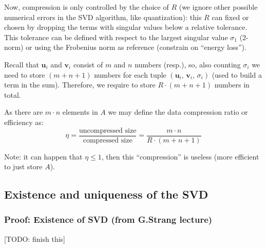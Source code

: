 \documentclass[
  12pt,
  paper=a4,
]{scrartcl} %
\begin{document}
Now, compression is only controlled by the choice of $R$ (we ignore other possible numerical errors in the SVD algorithm, like quantization): this $R$ can fixed or chosen by dropping the terms with singular values below a relative tolerance. This tolerance can be defined with respect to the largest singular value $\sigma_1$ (2-norm) or using the Frobenius norm as reference (constrain on ``energy loss'').


Recall that $\bm u_i$ and $\bm v_i$ consist of $m$ and $n$ numbers (resp.), so, also counting $\sigma_i$ we need to store $(m+n+1)$ numbers for each tuple $(\bm u_i,\,\bm v_i,\,\sigma_i)$ (used to build a term in the sum). Therefore, we require to store $R\cdot (m+n+1)$ numbers in total.

As there are $m\cdot n$ elements in $A$ we may define the data compression ratio or efficiency as:
\[
\eta
= \frac{\text{uncompressed size}}{\text{compressed size}}
= \frac{m\cdot n}{R\cdot (m+n+1)}
\]

Note: it can happen that $\eta\le 1$, then this ``compression'' is useless (more efficient to just store $A$).

\subsection*{Existence and uniqueness of the SVD}

\subsubsection*{Proof: Existence of SVD (from G.\@ Strang lecture)}
[TODO: finish this]





\end{document}
